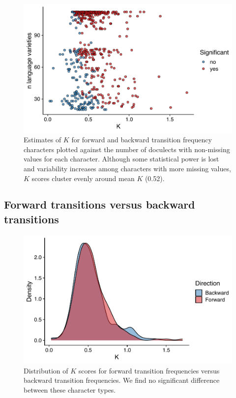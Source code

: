 \begin{figure}[tbp]

{\centering \includegraphics[width=0.66\linewidth]{05-phylo-signal/fig/k-scatterplot} 

}

\caption[Estimates of $K$ plotted against the number of doculects with non-missing values for each character]{Estimates of $K$ for forward and backward transition frequency characters plotted against the number of doculects with non-missing values for each character. Although some statistical power is lost and variability increases among characters with more missing values, $K$ scores cluster evenly around mean $K$ (0.52).}\label{fig:k-scatterplot}
\end{figure}

\hypertarget{fwd-vs-bkwd}{%
\subsection{Forward transitions versus backward transitions}\label{fwd-vs-bkwd}}

\begin{figure}[tbp]

{\centering \includegraphics[width=0.66\linewidth]{05-phylo-signal/fig/k-fwd-bkwd} 

}

\caption[Distribution of $K$ scores for forward transition frequencies versus backward transition frequencies]{Distribution of $K$ scores for forward transition frequencies versus backward transition frequencies. We find no significant difference between these character types.}\label{fig:k-fwd-vs-bkwd}
\end{figure}

